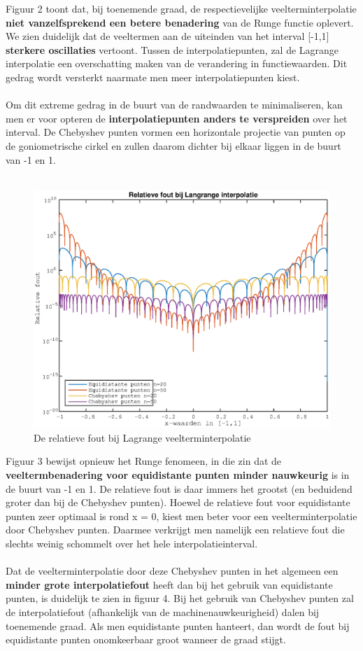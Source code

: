 \documentclass{article}
\begin{document}
Figuur 2 toont dat, bij toenemende graad, de respectievelijke veelterminterpolatie \textbf{niet vanzelfsprekend een betere benadering} van de Runge functie oplevert. We zien duidelijk dat de veeltermen aan de uiteinden van het interval [-1,1] \textbf{sterkere oscillaties} vertoont. Tussen de interpolatiepunten, zal de Lagrange interpolatie een overschatting maken van de verandering in functiewaarden. Dit gedrag wordt versterkt naarmate men meer interpolatiepunten kiest. 
\\  \\
Om dit extreme gedrag in de buurt van de randwaarden te minimaliseren, kan men er voor opteren de \textbf{interpolatiepunten anders te verspreiden} over het interval. De Chebyshev punten vormen een horizontale projectie van punten op de goniometrische cirkel en zullen daarom dichter bij elkaar liggen in de buurt van -1 en 1.  
\\ \\

\begin{figure}[H]
\includegraphics[width=0.75\columnwidth]{relatieve_fout}
\caption{De relatieve fout bij Lagrange veelterminterpolatie} %
\end{figure}


Figuur 3 bewijst opnieuw het Runge fenomeen, in die zin dat de \textbf{veeltermbenadering voor equidistante punten minder nauwkeurig} is in de buurt van -1 en 1. De relatieve fout is daar immers het grootst (en beduidend groter dan bij de Chebyshev punten). Hoewel de relatieve fout voor equidistante punten zeer optimaal is rond x = 0, kiest men beter voor een veelterminterpolatie door Chebyshev punten. Daarmee verkrijgt men namelijk een relatieve fout die slechts weinig schommelt over het hele interpolatieinterval. 
\\ \\ 
Dat de veelterminterpolatie door deze Chebyshev punten in het algemeen een \textbf{minder grote interpolatiefout} heeft dan bij het gebruik van equidistante punten, is duidelijk te zien in figuur 4. Bij het gebruik van Chebyshev punten zal de interpolatiefout (afhankelijk van de machinenauwkeurigheid) dalen bij toenemende graad. Als men equidistante punten hanteert, dan wordt de fout bij equidistante punten onomkeerbaar groot wanneer de graad stijgt.
\end{document}
